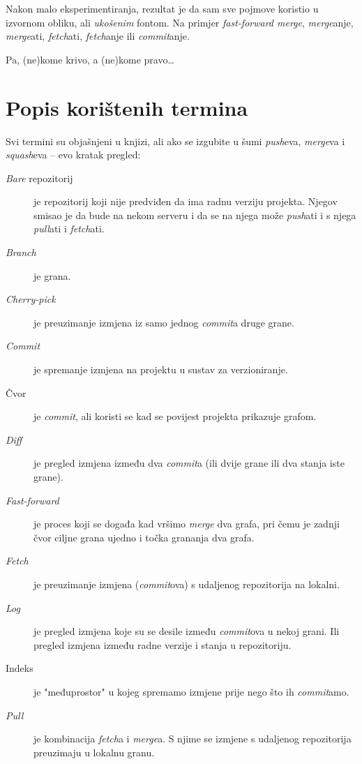 Nakon malo eksperimentiranja, rezultat je da sam sve pojmove koristio u izvornom obliku, ali \emph{ukošenim} fontom. Na primjer \emph{fast-forward merge}, \emph{merge}anje, \emph{merge}ati, \emph{fetch}ati, \emph{fetch}anje ili \emph{commit}anje.

Pa, (ne)kome krivo, a (ne)kome pravo\dots

\section*{Popis korištenih termina}

Svi termini su objašnjeni u knjizi, ali ako se izgubite u šumi \emph{push}eva, \emph{merge}va i \emph{squash}eva -- evo kratak pregled:

\begin{description}
    \item[\emph{Bare} repozitorij] je repozitorij koji nije predviđen da ima radnu verziju projekta. Njegov smisao je da bude na nekom serveru i da se na njega može \emph{push}ati i s njega \emph{pull}ati i \emph{fetch}ati.
    \item[\emph{Branch}] je grana.
    \item[\emph{Cherry-pick}] je preuzimanje izmjena iz samo jednog \emph{commit}a druge grane.
    \item[\emph{Commit}] je spremanje izmjena na projektu u sustav za verzioniranje.
    \item[Čvor] je \emph{commit}, ali koristi se kad se povijest projekta prikazuje grafom.
    \item[\emph{Diff}] je pregled izmjena između dva \emph{commit}a (ili dvije grane ili dva stanja iste grane).
    \item[\emph{Fast-forward}] je proces koji se događa kad vršimo \emph{merge} dva grafa, pri čemu je zadnji čvor ciljne grana ujedno i točka grananja dva grafa.
    \item[\emph{Fetch}] je preuzimanje izmjena (\emph{commit}ova) s udaljenog repozitorija na lokalni.
    \item[\emph{Log}] je pregled izmjena koje su se desile između \emph{commit}ova u nekoj grani. Ili pregled izmjena između radne verzije i stanja u repozitoriju.
    \item[Indeks] je "međuprostor" u kojeg spremamo izmjene prije nego što ih \emph{commit}amo.
    \item[\emph{Pull}] je kombinacija \emph{fetch}a i \emph{merge}a. S njime se izmjene s udaljenog repozitorija preuzimaju u lokalnu granu.

\end{description}
